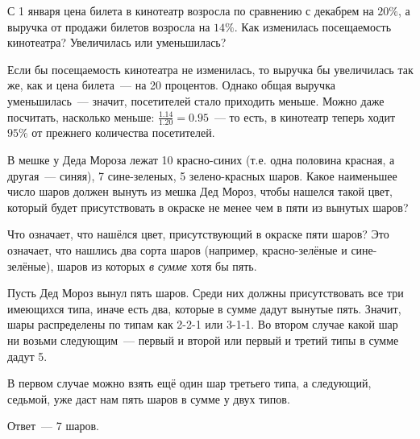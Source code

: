 \begin{itemize}
\itB С 1 января цена билета в кинотеатр возросла по сравнению с декабрем на $20 \%$, а выручка от продажи билетов возросла на $14 \%$. Как изменилась посещаемость кинотеатра? Увеличилась или уменьшилась?

\itr Если бы посещаемость кинотеатра не изменилась, то выручка бы увеличилась так же, как и цена билета~— на 20 процентов. Однако общая выручка уменьшилась~— значит, посетителей стало приходить меньше. Можно даже посчитать, насколько меньше: $\tfrac{1.14}{1.20} = 0.95$~— то есть, в кинотеатр теперь ходит $95 \%$ от прежнего количества посетителей.

\itC В мешке у Деда Мороза лежат 10 красно-синих (т.е. одна половина красная, а другая~— синяя), 7 сине-зеленых, 5 зелено-красных шаров. Какое наименьшее число шаров должен вынуть из мешка Дед Мороз, чтобы нашелся такой цвет, который будет присутствовать в окраске не менее чем в пяти из вынутых шаров?

\itr Что означает, что нашёлся цвет, присутствующий в окраске пяти шаров? Это означает, что нашлись два сорта шаров (например, красно-зелёные и сине-зелёные), шаров из которых {\itshape в сумме} хотя бы пять.

Пусть Дед Мороз вынул пять шаров. Среди них должны присутствовать все три имеющихся типа, иначе есть два, которые в сумме дадут вынутые пять. Значит, шары распределены по типам как 2-2-1 или 3-1-1. Во втором случае какой шар ни возьми следующим~— первый и второй или первый и третий типы в сумме дадут 5.

В первом случае можно взять ещё один шар третьего типа, а следующий, седьмой, уже даст нам пять шаров в сумме у двух типов.

Ответ~— 7 шаров.
\bigbreak\noindent

\end{itemize}


